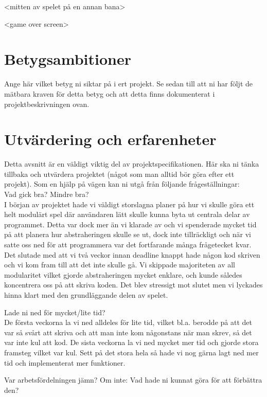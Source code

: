 <mitten av spelet på en annan bana>

<game over screen>

\section{Betygsambitioner}
Ange här vilket betyg ni siktar på i ert projekt.  Se sedan till att ni har följt de mätbara kraven för detta betyg och att detta finns dokumenterat i projektbeskrivningen ovan.\\
\section{Utvärdering och erfarenheter}
Detta avsnitt är en väldigt viktig del av projektspecifikationen. Här ska ni tänka tillbaka och utvärdera projektet (något som man alltid bör göra efter ett projekt). Som en hjälp på vägen kan ni utgå från följande frågeställningar:\\
Vad gick bra? Mindre bra?\\

I början av projektet hade vi väldigt storslagna planer på hur vi skulle göra ett helt modulärt spel där användaren lätt skulle kunna byta ut centrala delar av programmet. Detta var dock mer än vi klarade av och vi spenderade mycket tid på att planera hur abstraheringen skulle se ut, dock inte tillräckligt och när vi satte oss ned för att programmera var det fortfarande många frågetecket kvar. Det slutade med att vi två veckor innan deadline knappt hade någon kod skriven och vi kom fram till att det inte skulle gå. Vi skippade majoriteten av all modularitet vilket gjorde abstraheringen mycket enklare, och kunde således koncentrera oss på att skriva koden. Det blev stressigt mot slutet men vi lyckades hinna klart med den grundläggande delen av spelet. 

Lade ni ned för mycket/lite tid?\\

De första veckorna la vi ned alldeles för lite tid, vilket bl.a. berodde på att det var så svårt att skriva och att man inte kom någonstans när man skrev, så det var inte kul att kod. De sista veckorna la vi ned mycket mer tid och gjorde stora framsteg vilket var kul. Sett på det stora hela så hade vi nog gärna lagt ned mer tid och implementerat mer funktioner.

Var arbetsfördelningen jämn? Om inte: Vad hade ni kunnat göra för att förbättra den?\\

